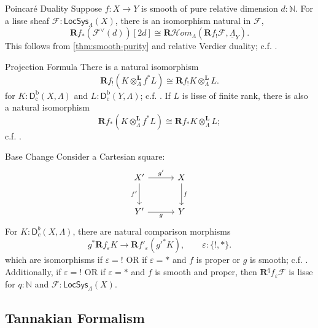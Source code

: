 \documentclass[11pt,letterpaper]{article}
\theoremstyle{numberfirstplain}
\numberwithin{equation}{theorem}
\theoremstyle{numberfirstupright}
\begin{document}
\begin{custom}{Poincar\'e Duality}\label{thm:poincare-duality}
Suppose $f:X\to Y$ is smooth of pure relative dimension $d:\mathbb N$.
For a lisse sheaf $\mathcal F:\mathsf{LocSys}_\Lambda(X)$,
there is an isomorphism natural in $\mathcal F$,
\[
\mathbf Rf_*(\mathcal F^\vee(d))[2d]
\cong
\mathbf R\mathcal Hom_\Lambda(\mathbf Rf_!\mathcal F,\underline{\Lambda}_Y).
\]
This follows from \cref{thm:smooth-purity} and relative Verdier duality; c.f. \cite[Lemma~63.11.5]{StacksProject}.
\end{custom}

\begin{custom}{Projection Formula}\label{thm:projection-formula}
There is a natural isomorphism
\[
\mathbf Rf_!(K\otimes_\Lambda^{\mathbf L}f^*L)
\cong
\mathbf Rf_!K\otimes_\Lambda^{\mathbf L}L.
\]
for $K:\mathsf D_{\mathrm c}^{\mathrm b}(X,\Lambda)$ and $L:\mathsf D_{\mathrm c}^{\mathrm b}(Y,\Lambda)$; c.f. \cite[Lemma~63.10.7, Tag~0GL5]{StacksProject}.
If $L$ is lisse of finite rank, there is also a natural isomorphism
\[
\mathbf Rf_*(K\otimes_\Lambda^{\mathbf L}f^*L)
\cong
\mathbf Rf_*K\otimes_\Lambda^{\mathbf L}L;
\]
c.f. \cite[Lemma~21.50.1, Tag~0944]{StacksProject}.
\end{custom}

\begin{custom}{Base Change}\label{thm:base-change}
Consider a Cartesian square:
\[
\begin{tikzcd}[row sep=2.5em, column sep=3em]
X' \arrow[r,"g'"] \arrow[d,"f'"'] & X \arrow[d,"f"] \\
Y' \arrow[r,"g"'] & Y
\end{tikzcd}
\]
For $K:\mathsf D_c^b(X,\Lambda)$, there are natural comparison morphisms
\[
g^*\mathbf Rf_\varepsilon K
\longrightarrow
\mathbf Rf'_\varepsilon(g'^*K),
\qquad \varepsilon:\{!,*\}.
\]
which are isomorphisms if $\varepsilon=!$ OR if $\varepsilon=*$ and $f$ is proper or $g$ is smooth; c.f. \cite[Theorems~59.91.11 and~59.89.2, and Lemma~63.9.4]{StacksProject}.
Additionally, if $\varepsilon=!$ OR if $\varepsilon=*$ and $f$ is smooth and proper, then $\mathbf R^qf_{\varepsilon}\mathcal F$ is lisse for $q:\mathbb N$ and $\mathcal F:\mathsf{LocSys}_{\Lambda}(X)$. 
\end{custom}

\subsection{Tannakian Formalism}\label{subsec:tannakian-formalism}
\end{document}

